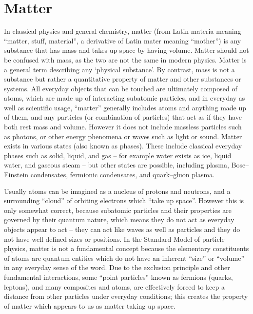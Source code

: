 \hypertarget{matter}{%
\section{Matter}\label{matter}}

In classical physics and general chemistry, matter (from Latin materia meaning “matter, stuff, material”, a derivative of Latin mater meaning “mother”) is any substance that has mass and takes up space by having volume. Matter should not be confused with mass, as the two are not the same in modern physics. Matter is a general term describing any `physical substance'. By contrast, mass is not a substance but rather a quantitative property of matter and other substances or systems. All everyday objects that can be touched are ultimately composed of atoms, which are made up of interacting subatomic particles, and in everyday as well as scientific usage, ``matter'' generally includes atoms and anything made up of them, and any particles (or combination of particles) that act as if they have both rest mass and volume. However it does not include massless particles such as photons, or other energy phenomena or waves such as light or sound. Matter exists in various states (also known as phases). These include classical everyday phases such as solid, liquid, and gas -- for example water exists as ice, liquid water, and gaseous steam -- but other states are possible, including plasma, Bose--Einstein condensates, fermionic condensates, and quark--gluon plasma.

Usually atoms can be imagined as a nucleus of protons and neutrons, and a surrounding ``cloud'' of orbiting electrons which ``take up space''. However this is only somewhat correct, because subatomic particles and their properties are governed by their quantum nature, which means they do not act as everyday objects appear to act -- they can act like waves as well as particles and they do not have well-defined sizes or positions. In the Standard Model of particle physics, matter is not a fundamental concept because the elementary constituents of atoms are quantum entities which do not have an inherent ``size'' or ``volume'' in any everyday sense of the word. Due to the exclusion principle and other fundamental interactions, some ``point particles'' known as fermions (quarks, leptons), and many composites and atoms, are effectively forced to keep a distance from other particles under everyday conditions; this creates the property of matter which appears to us as matter taking up space.

